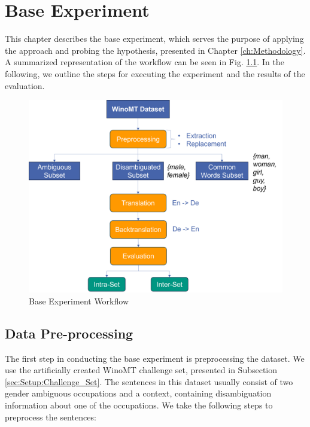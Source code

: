 \chapter{Base Experiment}
\label{ch:Base_Experiment}

This chapter describes the base experiment, which serves the purpose of applying the approach and probing the hypothesis, presented in Chapter \ref{ch:Methodology}. A summarized representation of the workflow can be seen in Fig. \ref{fig:base_workflow}. In the following, we outline the steps for executing the experiment and the results of the evaluation.

\begin{figure}[!htb]
  \centering
  \includegraphics[scale=0.55]{figures/base_workflow.png}
  \caption{Base Experiment Workflow}
  \label{fig:base_workflow}
\end{figure}

\section{Data Pre-processing}
\label{sec:Base_Experiment:Pre-processing}
The first step in conducting the base experiment is preprocessing the dataset. We use the artificially created WinoMT challenge set, presented in Subsection \ref{sec:Setup:Challenge_Set}. The sentences in this dataset usually consist of two gender ambiguous occupations and a context, containing disambiguation information about one of the occupations. We take the following steps to preprocess the sentences:

